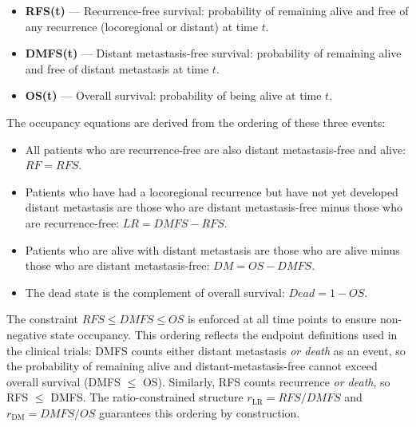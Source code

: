 \documentclass[11pt,a4paper]{article}
\begin{document}
\begin{itemize}
    \item \textbf{RFS(t)} --- Recurrence-free survival: probability of remaining alive and free of any recurrence (locoregional or distant) at time $t$.
    \item \textbf{DMFS(t)} --- Distant metastasis-free survival: probability of remaining alive and free of distant metastasis at time $t$.
    \item \textbf{OS(t)} --- Overall survival: probability of being alive at time $t$.
\end{itemize}

The occupancy equations are derived from the ordering of these three events:
\begin{itemize}
    \item All patients who are recurrence-free are also distant metastasis-free and alive: $RF = RFS$.
    \item Patients who have had a locoregional recurrence but have not yet developed distant metastasis are those who are distant metastasis-free minus those who are recurrence-free: $LR = DMFS - RFS$.
    \item Patients who are alive with distant metastasis are those who are alive minus those who are distant metastasis-free: $DM = OS - DMFS$.
    \item The dead state is the complement of overall survival: $Dead = 1 - OS$.
\end{itemize}

The constraint $RFS \leq DMFS \leq OS$ is enforced at all time points to ensure non-negative state occupancy. This ordering reflects the endpoint definitions used in the clinical trials: DMFS counts either distant metastasis \textit{or death} as an event, so the probability of remaining alive and distant-metastasis-free cannot exceed overall survival (DMFS $\leq$ OS). Similarly, RFS counts recurrence \textit{or death}, so RFS $\leq$ DMFS. The ratio-constrained structure $r_{\text{LR}} = RFS/DMFS$ and $r_{\text{DM}} = DMFS/OS$ guarantees this ordering by construction.
\end{document}

